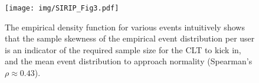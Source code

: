 \begin{figure}[!t]
    \centering
    \texttt{[image: img/SIRIP\_Fig3.pdf]}
    \caption{The empirical density function for various events intuitively shows that the sample skewness of the empirical event distribution per user is an indicator of the required sample size for the CLT to kick in, and the mean event distribution to approach normality (Spearman's $\rho\approx0.43$).}
    \label{fig:3}
\end{figure}
